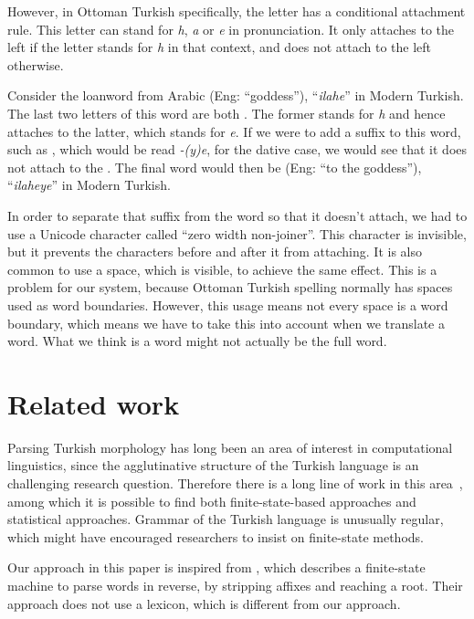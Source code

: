 \documentclass[10pt,twocolumn]{article}
\theoremstyle{nonumberplain}
\newcommand{\otto}[1]{\RLE{\ottoman{}\Large{}#1}}
\newcommand{\word}[1]{``\emph{#1}''}
\begin{document}
However, in Ottoman Turkish specifically, the letter \otto{ہ} has a conditional
attachment rule. This letter can stand for \emph{h}, \emph{a} or \emph{e} in
pronunciation. It only attaches to the left if the letter \otto{ہ} stands for
\emph{h} in that context, and does not attach to the left otherwise.

Consider the loanword from Arabic \otto{الهه} (Eng: ``goddess''), \word{ilahe} in Modern Turkish.
The last two letters of this word are both \otto{ہ}. The former stands for \emph{h} and hence attaches to the latter, which stands for \emph{e}.
If we were to add a suffix to this word, such as \otto{يه}, which would be read \emph{-(y)e}, for the dative case, we would see that it does not attach to the \otto{ہ}. The final word would then be \otto{الهه‌يه} (Eng:  ``to the goddess''), \word{ilaheye} in Modern Turkish.

In order to separate that suffix from the word so that it doesn't attach, we
had to use a Unicode character called ``zero width non-joiner''. This character is invisible, but it prevents the characters before and after it from attaching.
It is also common to use a space, which is visible, to achieve the same effect.
This is a problem for our system, because Ottoman Turkish spelling normally has
spaces used as word boundaries.  However, this usage means not every space is a
word boundary, which means we have to take this into account when we translate
a word. What we think is a word might not actually be the full word.


\section{Related work}

Parsing Turkish morphology has long been an area of interest in computational
linguistics, since the agglutinative structure of the Turkish language
is an challenging research question. Therefore there is a long line of work in this area~\cite{hankamer1986finite, solak1992parsing, oflazer1994two, oflazer1994outline, hakkani2002statistical, eryigit2004affix, sak2007morphological, sak2009stochastic, coltekin2010freely}, among which it is possible to find both finite-state-based approaches and statistical approaches.
Grammar of the Turkish language is unusually regular, which might have
encouraged researchers to insist on finite-state methods.

Our approach in this paper is inspired from \citet{eryigit2004affix}, which
describes a finite-state machine to parse words in reverse, by stripping
affixes and reaching a root. Their approach does not use a lexicon, which is
different from our approach.
\end{document}
